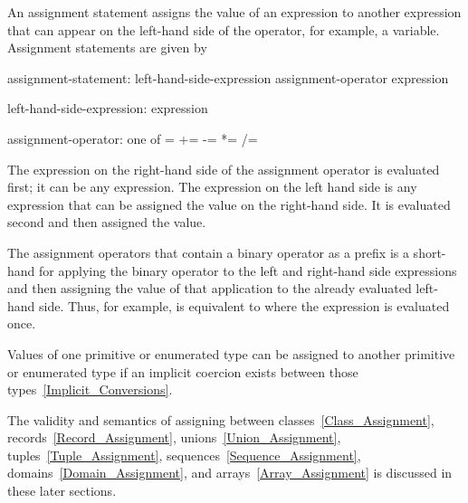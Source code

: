 An assignment statement assigns the value of an expression to another
expression that can appear on the left-hand side of the operator, for
example, a variable.  Assignment statements are given by

\begin{syntax}
assignment-statement:
  left-hand-side-expression assignment-operator expression

left-hand-side-expression:
  expression

assignment-operator: one of
   = += -= *= /= %
\end{syntax}

The expression on the right-hand side of the assignment operator is
evaluated first; it can be any expression.  The expression on the left
hand side is any expression that can be assigned the value on the
right-hand side.  It is evaluated second and then assigned the value.

The assignment operators that contain a binary operator as a prefix is
a short-hand for applying the binary operator to the left and right-hand
side expressions and
then assigning the value of that application to the already evaluated
left-hand side.  Thus, for example,  is equivalent to
 where the expression  is evaluated once.

Values of one primitive or enumerated type can be assigned to another
primitive or enumerated type if an implicit coercion exists between
those types~\ref{Implicit_Conversions}.

The validity and semantics of assigning between
classes~\ref{Class_Assignment}, records~\ref{Record_Assignment},
unions~\ref{Union_Assignment}, tuples~\ref{Tuple_Assignment},
sequences~\ref{Sequence_Assignment}, domains~\ref{Domain_Assignment},
and arrays~\ref{Array_Assignment} is discussed in these later
sections.
